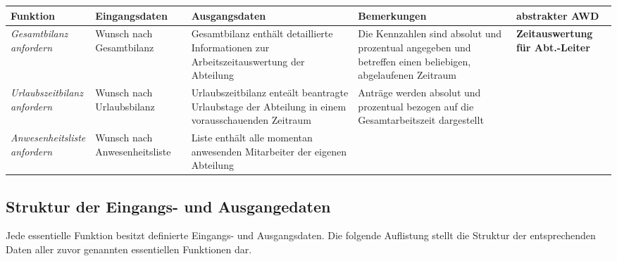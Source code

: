 {
\hspace{-3,5cm}
\footnotesize
\begin{tabular}{|p{3cm}|p{4cm}|p{4cm}|p{4cm}|p{2cm}|}
	\hline
		\textbf{Funktion	} &	
		\textbf{Eingangsdaten} &
		\textbf{Ausgangsdaten}& 
		\textbf{Bemerkungen}	&
		\textbf{abstrakter AWD} \\
	\hline \hline 
		\textit{Gesamtbilanz \newline anfordern} &
		Wunsch nach Gesamtbilanz &
		Gesamtbilanz enth\"alt detaillierte Informationen zur Arbeits\-zeit\-auswertung der Abteilung &
		Die Kennzahlen sind absolut und prozentual angegeben und betreffen einen beliebigen, abgelaufenen Zeitraum &
		\textbf{Zeitaus\-wertung f\"ur Abt.-Leiter}\\
	\cline{1-4}
		\textit{Urlaubszeitbilanz \newline anfordern} &
		Wunsch nach Urlaubsbilanz &
		Urlaubszeitbilanz ente\"alt beantragte Urlaubstage der Abteilung in einem vorausschauenden Zeitraum &
		Antr\"age werden absolut und prozentual bezogen auf die Gesamtarbeitszeit dargestellt &
		\\ 
	\cline{1-4}
		\textit{Anwesenheitsliste \newline anfordern}&
		Wunsch nach Anwesenheitsliste &
		Liste enth\"alt alle momentan anwesenden Mitarbeiter der eigenen Abteilung &
		&
		\\
	\hline
\end{tabular}
}

\vspace{1cm}

\subsection{Struktur der Eingangs- und Ausgangedaten}
Jede essentielle Funktion besitzt definierte Eingangs- und Ausgangsdaten. Die folgende Auflistung stellt die Struktur der entsprechenden Daten aller zuvor genannten essentiellen Funktionen dar.

